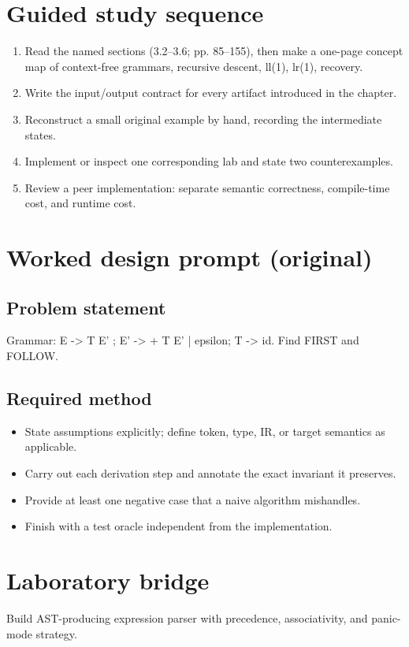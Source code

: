 \documentclass[10pt,letterpaper]{article}
\begin{document}
\section{Guided study sequence}
\begin{enumerate}
\item Read the named sections (3.2--3.6; pp. 85--155), then make a one-page concept map of context-free grammars, recursive descent, ll(1), lr(1), recovery.
\item Write the input/output contract for every artifact introduced in the chapter.
\item Reconstruct a small original example by hand, recording the intermediate states.
\item Implement or inspect one corresponding lab and state two counterexamples.
\item Review a peer implementation: separate semantic correctness, compile-time cost, and runtime cost.
\end{enumerate}

\section{Worked design prompt (original)}
\subsection{Problem statement}
Grammar: E -> T E' ; E' -> + T E' | epsilon; T -> id. Find FIRST and FOLLOW.
\subsection{Required method}
\begin{itemize}
\item State assumptions explicitly; define token, type, IR, or target semantics as applicable.
\item Carry out each derivation step and annotate the exact invariant it preserves.
\item Provide at least one negative case that a naive algorithm mishandles.
\item Finish with a test oracle independent from the implementation.
\end{itemize}


\section{Laboratory bridge}
Build AST-producing expression parser with precedence, associativity, and panic-mode strategy.
\end{document}
